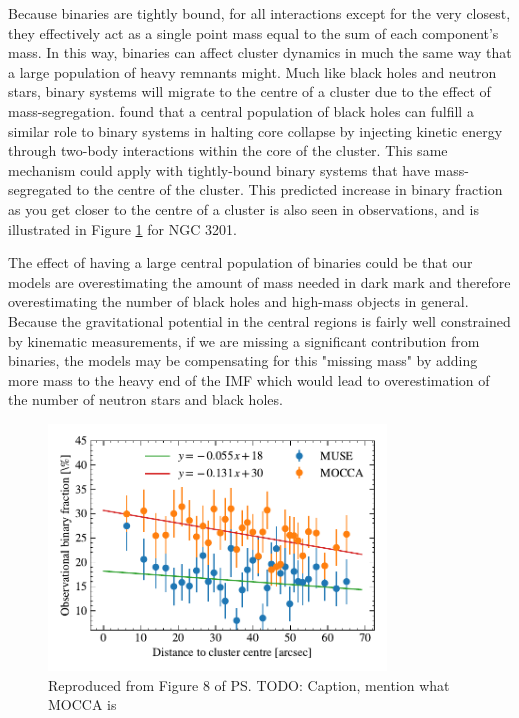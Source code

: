 Because binaries are tightly bound, for all interactions except for the very closest, they
effectively act as a single point mass equal to the sum of each component's mass. In this way,
binaries can affect cluster dynamics in much the same way that a large population of heavy remnants
might. Much like black holes and neutron stars, binary systems will migrate to the centre of a
cluster due to the effect of mass-segregation. \citet{Kremer2019} found that a central population of
black holes can fulfill a similar role to binary systems in halting core collapse by injecting
kinetic energy through two-body interactions within the core of the cluster. This same mechanism
could apply with tightly-bound binary systems that have mass-segregated to the centre of the
cluster. This predicted increase in binary fraction as you get closer to the centre of a cluster is
also seen in observations, and is illustrated in Figure \ref{fig:1/radial_binary_fraction} for NGC
3201.

The effect of having a large central population of binaries could be that our models are
overestimating the amount of mass needed in dark mark and therefore overestimating the number of
black holes and high-mass objects in general. Because the gravitational potential in the central
regions is fairly well constrained by kinematic measurements, if we are missing a significant
contribution from binaries, the models may be compensating for this "missing mass" by adding more
mass to the heavy end of the IMF which would lead to overestimation of the number of neutron stars
and black holes.




\begin{figure}
	\centering
	\includegraphics[width=0.8\textwidth]{figures/radial_binarity.pdf}
	\caption{Reproduced from Figure 8 of \citet{Giesers2019} \ps{TODO: Caption, mention what MOCCA is}}
	\label{fig:1/radial_binary_fraction}
\end{figure}

